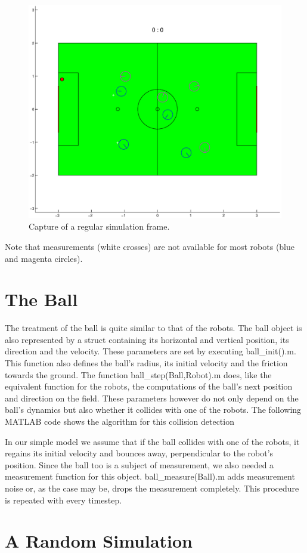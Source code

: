 \begin{figure}[htbp]
	\centering
    	\includegraphics[width=12cm]{./2_Simulation/plot_robots}
  	\caption{Capture of a regular simulation frame.}
  	\label{Plot_robots}
\end{figure}

Note that measurements (white crosses) are not available for most robots (blue and magenta circles).


\section{The Ball}

The treatment of the ball is quite similar to that of the robots. The ball object is also represented by a struct containing its horizontal and vertical position, its direction and the velocity. These parameters are set by executing {\selectfont ball\_init().m}. This function also defines the ball's radius, its initial velocity and the friction towards the ground. The function {\selectfont ball\_step(Ball,Robot).m} does, like the equivalent function for the robots, the computations of the ball's next position and direction on the field. These parameters however do not only depend on the ball's dynamics but also whether it collides with one of the robots. The following MATLAB code shows the algorithm for this collision detection


\parskip 20pt

In our simple model we assume that if the ball collides with one of the robots, it regains its initial velocity and bounces away, perpendicular to the robot's position. Since the ball too is a subject of measurement, we also needed a measurement function for this object. {\selectfont ball\_measure(Ball).m} adds measurement noise or, as the case may be, drops the measurement completely. This procedure is repeated with every timestep.


\parskip 10pt


\section{A Random Simulation}

